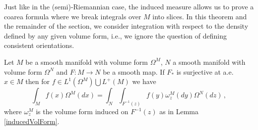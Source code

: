 Just like in the (semi)-Riemannian case, the induced measure allows us to prove a coarea formula where we break integrals over $M$ into slices. In this theorem and the remainder of the section, we consider integration with respect to the density defined by any given volume form, i.e., we ignore the question of defining consistent orientations.
\begin{theorem}\label{volFormCoarea}
Let $M$ be a smooth manifold with volume form $\Omega^M$, $N$ a smooth manifold with volume form $\Omega^N$ and $F:M\rightarrow N$ be a smooth map.  If $F_*$ is surjective at a.e. $x\in M$ then for $f\in L^1(\Omega^M)\bigcup L^+(M)$ we have
\begin{equation}\label{coareaFormula}
\int_Mf(x) \Omega^M(dx)=\int_{N}\int_{F^{-1}(z)} f(y)\omega^M_z(dy) \Omega^N(dz)\,,
\end{equation}
where $\omega^M_z$ is the volume form induced on $F^{-1}(z)$ as in Lemma \ref{inducedVolForm}.
\end{theorem}
